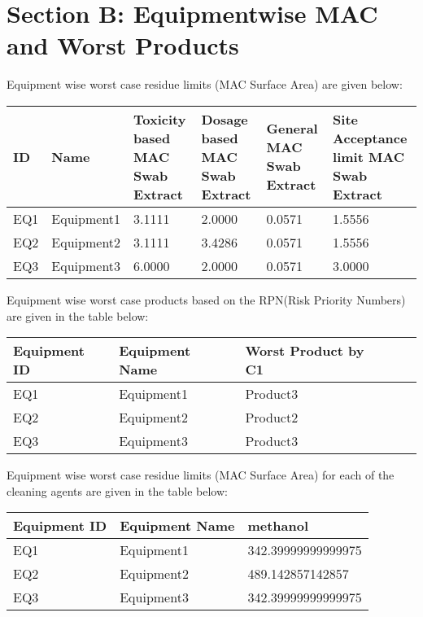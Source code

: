 \documentclass{article}
\begin{document}
        \newpage
        \section{Section B: Equipmentwise MAC and Worst Products}
        Equipment wise worst case residue limits (MAC Surface Area) are given below:
        \begin{longtable}[l]{|p{1.5cm} |p{2cm} |p{3cm} |p{3cm} |p{3cm} |p{3cm} |}
        
ID&Name&Toxicity based MAC Swab Extract&Dosage based MAC Swab Extract&General MAC Swab Extract &Site Acceptance limit MAC Swab Extract\\
\hline

EQ1&Equipment1&3.1111&2.0000&0.0571&1.5556\\
\hline

EQ2&Equipment2&3.1111&3.4286&0.0571&1.5556\\
\hline

EQ3&Equipment3&6.0000&2.0000&0.0571&3.0000\\
\hline

        \end{longtable}
        Equipment wise worst case products based on the RPN(Risk Priority Numbers) are given in the table below:
        \begin{longtable}[l]{|p{3cm} |p{3cm} |p{3cm} |p{3cm} |p{3cm} |}
        
Equipment ID&Equipment Name&Worst Product by C1\\
\hline

EQ1&Equipment1&Product3\\
\hline

EQ2&Equipment2&Product2\\
\hline

EQ3&Equipment3&Product3\\
\hline

        \end{longtable}
        Equipment wise worst case residue limits (MAC Surface Area) for each of the cleaning agents are given in the table below:
        \begin{longtable}[l]{|p{2cm} |p{2cm} |p{4cm} |}
        
Equipment ID&Equipment Name&methanol\\
\hline

EQ1&Equipment1&342.39999999999975\\
\hline

EQ2&Equipment2&489.142857142857\\
\hline

EQ3&Equipment3&342.39999999999975\\
\hline

        \end{longtable}
        \newpage
\end{document}
